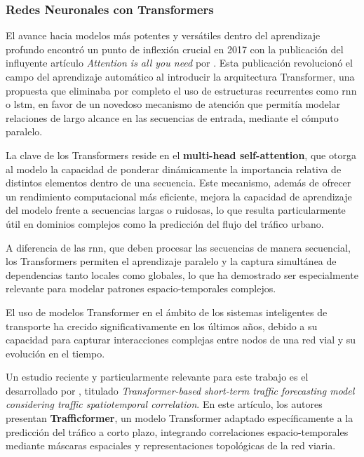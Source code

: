 \subsubsection*{Redes Neuronales con Transformers}

El avance hacia modelos más potentes y versátiles dentro del aprendizaje profundo encontró un punto de inflexión crucial en 2017 con la publicación del influyente artículo \textit{Attention is all you need} por \cite{attentionIsAllYouNeed}. Esta publicación revolucionó el campo del aprendizaje automático al introducir la arquitectura Transformer, una propuesta que eliminaba por completo el uso de estructuras recurrentes como \acrshort{rnn} o \acrshort{lstm}, en favor de un novedoso mecanismo de atención que permitía modelar relaciones de largo alcance en las secuencias de entrada, mediante el cómputo paralelo.

La clave de los Transformers reside en el \textbf{multi-head self-attention}, que otorga al modelo la capacidad de ponderar dinámicamente la importancia relativa de distintos elementos dentro de una secuencia. Este mecanismo, además de ofrecer un rendimiento computacional más eficiente, mejora la capacidad de aprendizaje del modelo frente a secuencias largas o ruidosas, lo que resulta particularmente útil en dominios complejos como la predicción del flujo del tráfico urbano.

A diferencia de las \acrshort{rnn}, que deben procesar las secuencias de manera secuencial, los Transformers permiten el aprendizaje paralelo y la captura simultánea de dependencias tanto locales como globales, lo que ha demostrado ser especialmente relevante para modelar patrones espacio-temporales complejos.

\vspace{0.5cm}

El uso de modelos Transformer en el ámbito de los sistemas inteligentes de transporte ha crecido significativamente en los últimos años, debido a su capacidad para capturar interacciones complejas entre nodos de una red vial y su evolución en el tiempo.

Un estudio reciente y particularmente relevante para este trabajo es el desarrollado por \cite{trafficformer}, titulado \textit{Transformer-based short-term traffic forecasting model considering traffic spatiotemporal correlation}. En este artículo, los autores presentan \textbf{Trafficformer}, un modelo Transformer adaptado específicamente a la predicción del tráfico a corto plazo, integrando correlaciones espacio-temporales mediante máscaras espaciales y representaciones topológicas de la red viaria.

